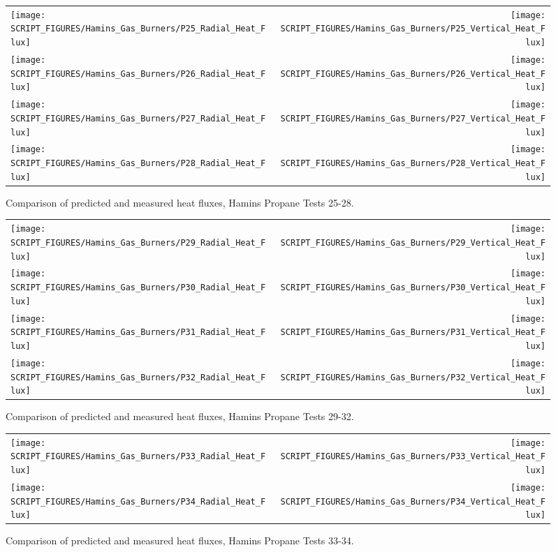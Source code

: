 \begin{figure}[p]
\begin{tabular*}{\textwidth}{l@{\extracolsep{\fill}}r}
\texttt{[image: SCRIPT\_FIGURES/Hamins\_Gas\_Burners/P25\_Radial\_Heat\_Flux]} &
\texttt{[image: SCRIPT\_FIGURES/Hamins\_Gas\_Burners/P25\_Vertical\_Heat\_Flux]} \\
\texttt{[image: SCRIPT\_FIGURES/Hamins\_Gas\_Burners/P26\_Radial\_Heat\_Flux]} &
\texttt{[image: SCRIPT\_FIGURES/Hamins\_Gas\_Burners/P26\_Vertical\_Heat\_Flux]} \\
\texttt{[image: SCRIPT\_FIGURES/Hamins\_Gas\_Burners/P27\_Radial\_Heat\_Flux]} &
\texttt{[image: SCRIPT\_FIGURES/Hamins\_Gas\_Burners/P27\_Vertical\_Heat\_Flux]} \\
\texttt{[image: SCRIPT\_FIGURES/Hamins\_Gas\_Burners/P28\_Radial\_Heat\_Flux]} &
\texttt{[image: SCRIPT\_FIGURES/Hamins\_Gas\_Burners/P28\_Vertical\_Heat\_Flux]}
\end{tabular*}
\label{Hamins_Propane_25-28}
\caption[Heat flux predictions, Hamins propane burner Tests 25-28]
{Comparison of predicted and measured heat fluxes, Hamins Propane Tests 25-28.}
\end{figure}

\begin{figure}[p]
\begin{tabular*}{\textwidth}{l@{\extracolsep{\fill}}r}
\texttt{[image: SCRIPT\_FIGURES/Hamins\_Gas\_Burners/P29\_Radial\_Heat\_Flux]} &
\texttt{[image: SCRIPT\_FIGURES/Hamins\_Gas\_Burners/P29\_Vertical\_Heat\_Flux]} \\
\texttt{[image: SCRIPT\_FIGURES/Hamins\_Gas\_Burners/P30\_Radial\_Heat\_Flux]} &
\texttt{[image: SCRIPT\_FIGURES/Hamins\_Gas\_Burners/P30\_Vertical\_Heat\_Flux]} \\
\texttt{[image: SCRIPT\_FIGURES/Hamins\_Gas\_Burners/P31\_Radial\_Heat\_Flux]} &
\texttt{[image: SCRIPT\_FIGURES/Hamins\_Gas\_Burners/P31\_Vertical\_Heat\_Flux]} \\
\texttt{[image: SCRIPT\_FIGURES/Hamins\_Gas\_Burners/P32\_Radial\_Heat\_Flux]} &
\texttt{[image: SCRIPT\_FIGURES/Hamins\_Gas\_Burners/P32\_Vertical\_Heat\_Flux]}
\end{tabular*}
\label{Hamins_Propane_29-32}
\caption[Heat flux predictions, Hamins propane burner Tests 29-32]
{Comparison of predicted and measured heat fluxes, Hamins Propane Tests 29-32.}
\end{figure}

\begin{figure}[p]
\begin{tabular*}{\textwidth}{l@{\extracolsep{\fill}}r}
\texttt{[image: SCRIPT\_FIGURES/Hamins\_Gas\_Burners/P33\_Radial\_Heat\_Flux]} &
\texttt{[image: SCRIPT\_FIGURES/Hamins\_Gas\_Burners/P33\_Vertical\_Heat\_Flux]} \\
\texttt{[image: SCRIPT\_FIGURES/Hamins\_Gas\_Burners/P34\_Radial\_Heat\_Flux]} &
\texttt{[image: SCRIPT\_FIGURES/Hamins\_Gas\_Burners/P34\_Vertical\_Heat\_Flux]}
\end{tabular*}
\label{Hamins_Propane_33-34}
\caption[Heat flux predictions, Hamins propane burner Tests 33-34]
{Comparison of predicted and measured heat fluxes, Hamins Propane Tests 33-34.}
\end{figure}

